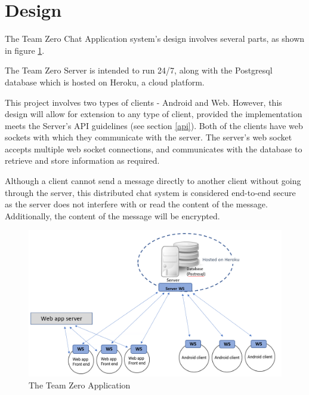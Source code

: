 \section{Design}

The Team Zero Chat Application system's design involves several parts, as shown in figure \ref{design}. 

The Team Zero Server is intended to run 24/7, along with the Postgresql database which is hosted on Heroku, a cloud platform.

This project involves two types of clients - Android and Web. However, this design will allow for extension to any type of client, provided the implementation meets the Server's API guidelines (see section \ref{api}). Both of the clients have web sockets with which they communicate with the server. The server's web socket accepts multiple web socket connections, and communicates with the database to retrieve and store information as required.

Although a client cannot send a message directly to another client without going through the server, this distributed chat system is considered end-to-end secure as the server does not interfere with or read the content of the message. Additionally, the content of the message will be encrypted.


\begin{figure}[H]
  \includegraphics[scale=0.3]{images/design.png}
  \caption{The Team Zero Application}
  \label{design}
\end{figure}
